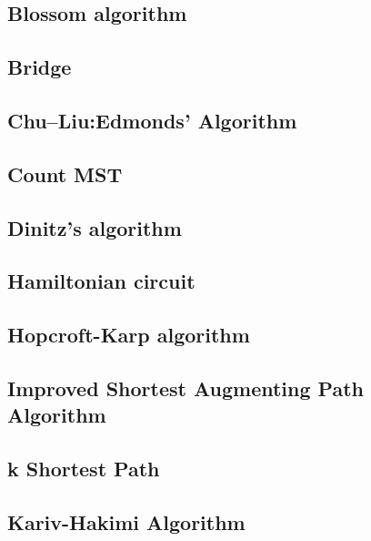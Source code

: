 \documentclass[a4paper,5pt,twocolumn,titlepage]{article}
\begin{document}
\subsection{Blossom algorithm}

\subsection{Bridge}

\subsection{Chu–Liu:Edmonds' Algorithm}

\subsection{Count MST}



\subsection{Dinitz's algorithm}


\subsection{Hamiltonian circuit}

\subsection{Hopcroft-Karp algorithm}

\subsection{Improved Shortest Augmenting Path Algorithm}

\subsection{k Shortest Path}

\subsection{Kariv-Hakimi Algorithm}

\end{document}
